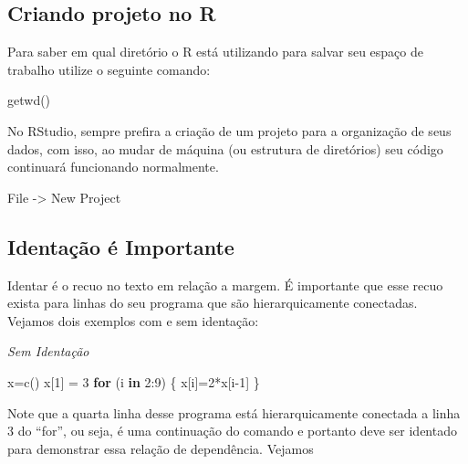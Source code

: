 \documentclass[
  letterpaper,
  DIV=11,
  numbers=noendperiod]{scrreprt}
\newenvironment{Shaded}{\begin{snugshade}}{\end{snugshade}}
\newcommand{\ControlFlowTok}[1]{\textcolor[rgb]{0.00,0.23,0.31}{\textbf{#1}}}
\newcommand{\DecValTok}[1]{\textcolor[rgb]{0.68,0.00,0.00}{#1}}
\newcommand{\FunctionTok}[1]{\textcolor[rgb]{0.28,0.35,0.67}{#1}}
\newcommand{\NormalTok}[1]{\textcolor[rgb]{0.00,0.23,0.31}{#1}}
\newcommand{\OtherTok}[1]{\textcolor[rgb]{0.00,0.23,0.31}{#1}}
\newcommand{\SpecialCharTok}[1]{\textcolor[rgb]{0.37,0.37,0.37}{#1}}
\begin{document}
\subsection{Criando projeto no R}\label{criando-projeto-no-r}

Para saber em qual diretório o R está utilizando para salvar seu espaço
de trabalho utilize o seguinte comando:

\begin{Shaded}
\begin{Highlighting}[]
\FunctionTok{getwd}\NormalTok{() }
\end{Highlighting}
\end{Shaded}

No RStudio, sempre prefira a criação de um projeto para a organização de
seus dados, com isso, ao mudar de máquina (ou estrutura de diretórios)
seu código continuará funcionando normalmente.

\begin{Shaded}
\begin{Highlighting}[]
\NormalTok{  File }\OtherTok{{-}\textgreater{}}\NormalTok{ New Project}
\end{Highlighting}
\end{Shaded}

\subsection{Identação é
Importante}\label{identauxe7uxe3o-uxe9-importante}

Identar é o recuo no texto em relação a margem. É importante que esse
recuo exista para linhas do seu programa que são hierarquicamente
conectadas. Vejamos dois exemplos com e sem identação:

\emph{Sem Identação}

\begin{Shaded}
\begin{Highlighting}[]
\NormalTok{x}\OtherTok{=}\FunctionTok{c}\NormalTok{()}
\NormalTok{x[}\DecValTok{1}\NormalTok{] }\OtherTok{=} \DecValTok{3}
\ControlFlowTok{for}\NormalTok{ (i }\ControlFlowTok{in} \DecValTok{2}\SpecialCharTok{:}\DecValTok{9}\NormalTok{) \{ }
\NormalTok{x[i]}\OtherTok{=}\DecValTok{2}\SpecialCharTok{*}\NormalTok{x[i}\DecValTok{{-}1}\NormalTok{]}
\NormalTok{\}}
\end{Highlighting}
\end{Shaded}

Note que a quarta linha desse programa está hierarquicamente conectada a
linha 3 do ``for'', ou seja, é uma continuação do comando e portanto
deve ser identado para demonstrar essa relação de dependência. Vejamos
\end{document}
